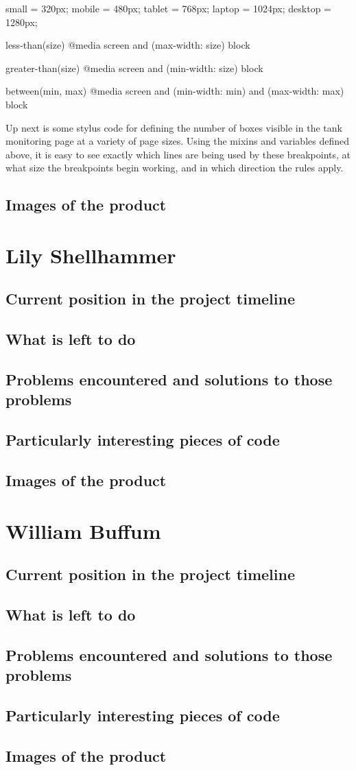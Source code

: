 \documentclass[draftclsnofoot,onecolumn,letterpaper,10pt,compsoc]{IEEEtran}
\begin{document}
small = 320px;
mobile = 480px;
tablet = 768px;
laptop = 1024px;
desktop = 1280px;

less-than(size)
  @media screen and (max-width: size)
    {block}

greater-than(size)
  @media screen and (min-width: size)
    {block}

between(min, max)
  @media screen and (min-width: min) and (max-width: max)
    {block}

Up next is some stylus code for defining the number of boxes visible in the tank monitoring page at a variety of page sizes. Using the mixins and variables defined above, it is easy to see exactly which lines are being used by these breakpoints, at what size the breakpoints begin working, and in which direction the rules apply.


\subsection{Images of the product}
\section{Lily Shellhammer}
\subsection{Current position in the project timeline}
\subsection{What is left to do}
\subsection{Problems encountered and solutions to those problems}
\subsection{Particularly interesting pieces of code}
\subsection{Images of the product}
\section{William Buffum}
\subsection{Current position in the project timeline}
\subsection{What is left to do}
\subsection{Problems encountered and solutions to those problems}
\subsection{Particularly interesting pieces of code}
\subsection{Images of the product}
\end{document}
